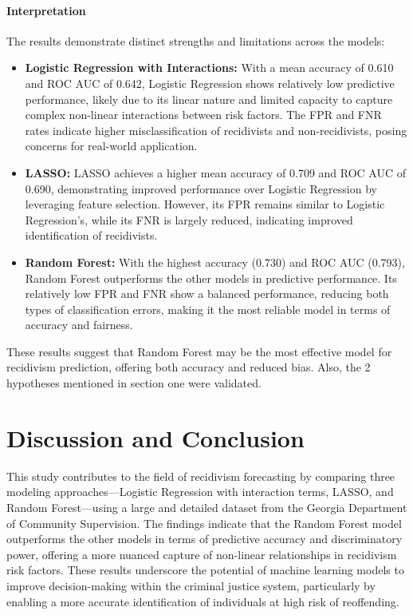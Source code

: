 \documentclass[12pt]{article}
\begin{document}
\paragraph{Interpretation}
The results demonstrate distinct strengths and limitations across the models:
\begin{itemize}
    \item \textbf{Logistic Regression with Interactions:} With a mean accuracy of 0.610 and ROC AUC of 0.642, Logistic Regression shows relatively low predictive performance, likely due to its linear nature and limited capacity to capture complex non-linear interactions between risk factors. The FPR and FNR rates indicate higher misclassification of recidivists and non-recidivists, posing concerns for real-world application.
    \item \textbf{LASSO:} LASSO achieves a higher mean accuracy of 0.709 and ROC AUC of 0.690, demonstrating improved performance over Logistic Regression by leveraging feature selection. However, its FPR remains similar to Logistic Regression’s, while its FNR is largely reduced, indicating improved identification of recidivists.
    \item \textbf{Random Forest:} With the highest accuracy (0.730) and ROC AUC (0.793), Random Forest outperforms the other models in predictive performance. Its relatively low FPR and FNR show a balanced performance, reducing both types of classification errors, making it the most reliable model in terms of accuracy and fairness.
\end{itemize}

These results suggest that Random Forest may be the most effective model for recidivism prediction, offering both accuracy and reduced bias. Also, the 2 hypotheses mentioned in section one were validated.

\section{Discussion and Conclusion}

This study contributes to the field of recidivism forecasting by comparing three modeling approaches—Logistic Regression with interaction terms, LASSO, and Random Forest—using a large and detailed dataset from the Georgia Department of Community Supervision. The findings indicate that the Random Forest model outperforms the other models in terms of predictive accuracy and discriminatory power, offering a more nuanced capture of non-linear relationships in recidivism risk factors. These results underscore the potential of machine learning models to improve decision-making within the criminal justice system, particularly by enabling a more accurate identification of individuals at high risk of reoffending.
\end{document}
